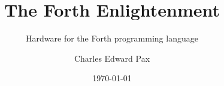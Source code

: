 \documentclass[
	letterpaper, %
	fontsize=10pt, %
	twoside=true, %
	numbers=noenddot, %
]{kaobook}
\begin{document}


\title[The Forth Enlightenment]{The Forth Enlightenment}
\subtitle{Hardware for the Forth programming language}

\author[Charles Edward Pax]{Charles Edward Pax}

\date{\today}

\publishers{Self-publishing}


\frontmatter %




%
%	
%	
%	
%	
%	
%	
%	
\end{document}
